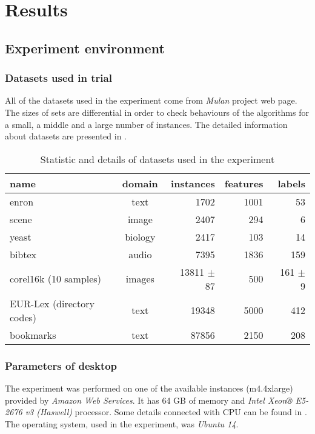 
\chapter{Results}

\section{Experiment environment}
\subsection{Datasets used in trial}

All of the datasets used in the experiment come from \textit{Mulan} project web page. The sizes of sets are differential in order to check behaviours of the algorithms for a small, a middle and a large number of instances. The detailed information about datasets are presented in . 

\begin{table}[h]
\centering
\caption{Statistic and details of datasets used in the experiment}
\label{tab:exp1}
    \begin{tabular}{l|c|r|r|r}
    name & domain & instances & features & labels \\ \hline \hline
    enron & text  &  1702  & 1001 &  53 \\
    scene & image &  2407  & 294 & 6 \\   
    yeast & biology & 2417 & 103 & 14 \\
    bibtex & audio & 7395 & 1836 & 159 \\
    corel16k (10 samples) & images & 13811 $\pm$ 87 & 500 & 161 $\pm$ 9\\
    EUR-Lex (directory codes) & text & 19348 & 5000 & 412 \\
    bookmarks & text & 87856 & 2150 & 208
    \end{tabular}
\end{table}

\subsection{Parameters of desktop}

The experiment was performed on one of the available instances (m4.4xlarge) provided by \textit{Amazon Web Services}. It has 64 GB of memory and \textit{Intel Xeon® E5-2676 v3 (Haswell)} processor. Some details connected with CPU can be found in . The operating system, used in the experiment, was \textit{Ubuntu 14}.

